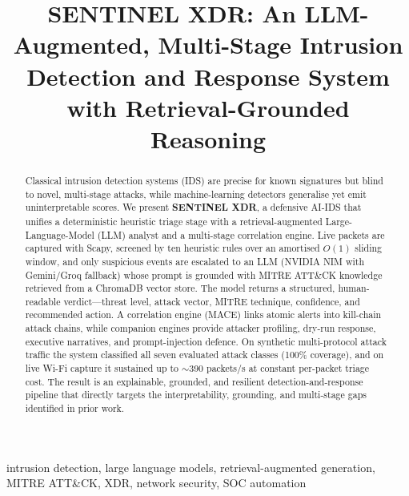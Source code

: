 \documentclass[conference]{IEEEtran}
\begin{document}
\title{SENTINEL XDR: An LLM-Augmented, Multi-Stage Intrusion Detection and Response System with Retrieval-Grounded Reasoning}

\author{
}

\maketitle

\begin{abstract}
Classical intrusion detection systems (IDS) are precise for known signatures but blind to novel, multi-stage attacks, while machine-learning detectors generalise yet emit uninterpretable scores. We present \textbf{SENTINEL XDR}, a defensive AI-IDS that unifies a deterministic heuristic triage stage with a retrieval-augmented Large-Language-Model (LLM) analyst and a multi-stage correlation engine. Live packets are captured with Scapy, screened by ten heuristic rules over an amortised $O(1)$ sliding window, and only suspicious events are escalated to an LLM (NVIDIA NIM with Gemini/Groq fallback) whose prompt is grounded with MITRE ATT\&CK knowledge retrieved from a ChromaDB vector store. The model returns a structured, human-readable verdict---threat level, attack vector, MITRE technique, confidence, and recommended action. A correlation engine (MACE) links atomic alerts into kill-chain attack chains, while companion engines provide attacker profiling, dry-run response, executive narratives, and prompt-injection defence. On synthetic multi-protocol attack traffic the system classified all seven evaluated attack classes (100\% coverage), and on live Wi-Fi capture it sustained up to $\sim$390 packets/s at constant per-packet triage cost. The result is an explainable, grounded, and resilient detection-and-response pipeline that directly targets the interpretability, grounding, and multi-stage gaps identified in prior work.
\end{abstract}

\begin{IEEEkeywords}
intrusion detection, large language models, retrieval-augmented generation, MITRE ATT\&CK, XDR, network security, SOC automation
\end{IEEEkeywords}
\end{document}
